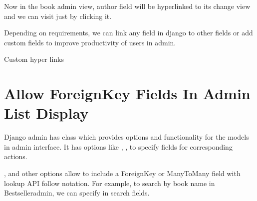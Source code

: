 \documentclass[letterpaper,11pt,english]{sphinxmanual}
\begin{document}
Now in the book admin view, author field will be hyperlinked to its change view and we can visit just by clicking it.

Depending on requirements, we can link any field in django to other fields or add custom fields to improve productivity of users in admin.

Custom hyper links



\chapter{Allow ForeignKey Fields In Admin List Display}
\label{\detokenize{admin_list_display_foreignkey:allow-foreignkey-fields-in-admin-list-display}}\label{\detokenize{admin_list_display_foreignkey::doc}}
Django admin has  class which provides options and functionality for the models in admin interface. It has options like , ,  to specify fields for corresponding actions.

,  and other options allow to include a ForeignKey or ManyToMany field with lookup API follow notation. For example, to search by book name in Bestselleradmin, we can specify  in search fields.

\begin{sphinxVerbatim}[commandchars=\\\{\}]
   

   


 
       
         


 
\end{sphinxVerbatim}
\end{document}
